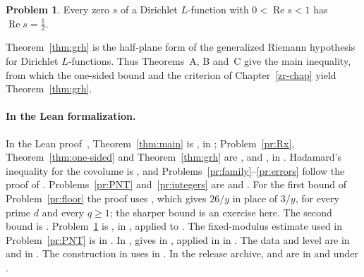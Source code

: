 \documentclass[reqno]{amsart}
\newcounter{chap}
\theoremstyle{definition}
\newtheorem{problem}{Problem}[section]
\theoremstyle{plain}
\begin{document}
\begin{problem}\label{pr:line}
Every zero \(s\) of a Dirichlet \(L\)-function with \(0 < \operatorname{Re} s < 1\) has \(\operatorname{Re} s = \frac12\).
\end{problem}

Theorem~\ref{thm:grh} is the half-plane form of the generalized Riemann hypothesis for Dirichlet \(L\)-functions.  Thus Theorems~A, B and~C give the main inequality, from which the one-sided bound and the criterion of Chapter~\ref{zr-chap} yield Theorem~\ref{thm:grh}.

{\raggedright
\paragraph{In the Lean formalization.}  In the Lean proof~\cite{GL}, Theorem~\ref{thm:main} is , in ; Problem~\ref{pr:Rx}, Theorem~\ref{thm:one-sided} and Theorem~\ref{thm:grh} are ,  and , in .  Hadamard's inequality for the covolume is , and Problems~\ref{pr:family}--\ref{pr:errors} follow the proof of .  Problems~\ref{pr:PNT} and~\ref{pr:integers} are  and .  For the first bound of Problem~\ref{pr:floor} the proof uses , which gives \(26/y\) in place of \(3/y\), for every prime \(d\) and every \(q \ge 1\); the sharper bound is an exercise here.  The second bound is .  Problem~\ref{pr:line} is , in , applied to .
The fixed-modulus estimate used in Problem~\ref{pr:PNT} is  in .  In ,  gives  in , applied in  in .  The data and level are  in  and  in .  The construction  in  uses  in .  In the release archive,  and  are in  and  under .\par}
\end{document}
